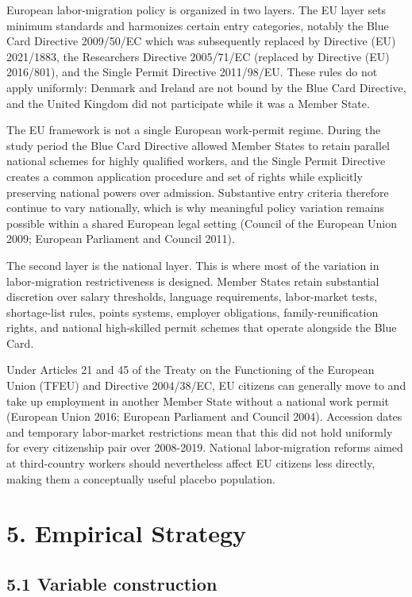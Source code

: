 \documentclass[11pt,a4paper]{article}
\begin{document}
European labor-migration policy is organized in two layers. The EU layer
sets minimum standards and harmonizes certain entry categories, notably
the Blue Card Directive 2009/50/EC which was subsequently replaced by
Directive (EU) 2021/1883, the Researchers Directive 2005/71/EC (replaced
by Directive (EU) 2016/801), and the Single Permit Directive 2011/98/EU.
These rules do not apply uniformly: Denmark and Ireland are not bound by
the Blue Card Directive, and the United Kingdom did not participate
while it was a Member State.

The EU framework is not a single European work-permit regime. During the
study period the Blue Card Directive allowed Member States to retain
parallel national schemes for highly qualified workers, and the Single
Permit Directive creates a common application procedure and set of
rights while explicitly preserving national powers over admission.
Substantive entry criteria therefore continue to vary nationally, which
is why meaningful policy variation remains possible within a shared
European legal setting (Council of the European Union 2009; European
Parliament and Council 2011).

The second layer is the national layer. This is where most of the
variation in labor-migration restrictiveness is designed. Member States
retain substantial discretion over salary thresholds, language
requirements, labor-market tests, shortage-list rules, points systems,
employer obligations, family-reunification rights, and national
high-skilled permit schemes that operate alongside the Blue Card.

Under Articles 21 and 45 of the Treaty on the Functioning of the
European Union (TFEU) and Directive 2004/38/EC, EU citizens can
generally move to and take up employment in another Member State without
a national work permit (European Union 2016; European Parliament and
Council 2004). Accession dates and temporary labor-market restrictions
mean that this did not hold uniformly for every citizenship pair over
2008-2019. National labor-migration reforms aimed at third-country
workers should nevertheless affect EU citizens less directly, making
them a conceptually useful placebo population.

\clearpage
\section{5. Empirical Strategy}\label{empirical-strategy}\begingroup{}

\subsection{5.1 Variable construction}\label{variable-construction}
\end{document}
